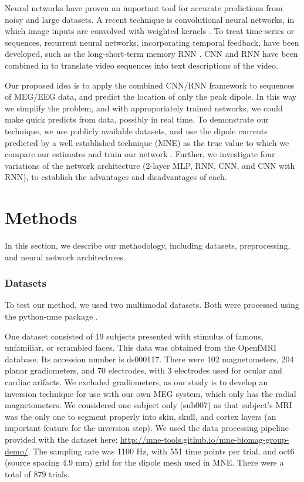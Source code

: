 \documentclass[journal]{IEEEtran}
\begin{document}
Neural networks have proven an important tool for accurate predictions from noisy and large datasets. A recent technique is convolutional neural networks, in which image inputs are convolved with weighted kernels \cite{lecun1998gradient}. To treat time-series or sequences, recurrent neural networks, incorporating temporal feedback, have been developed, such as the long-short-term memory RNN \cite{hochreiter1997long}. CNN and RNN have been combined in \cite{venugopalan2014translating} to translate video sequences into text descriptions of the video.


Our proposed idea is to apply the combined CNN/RNN framework to sequences of MEG/EEG data, and predict the location of only the peak dipole. In this way we simplify the problem, and with approporiately trained networks, we could make quick predicts from data, possibly in real time. To demonstrate our technique, we use publicly available datasets, and use the dipole currents predicted by a well established technique (MNE) as the true value to which we compare our estimates and train our network \cite{gramfort2014mne}. Further, we investigate four variations of the network architecture (2-layer MLP, RNN, CNN, and CNN with RNN), to establish the advantages and disadvantages of each.

\section{Methods}

In this section, we describe our methodology, including datasets, preprocessing, and neural network architectures.

\subsubsection{Datasets}

To test our method, we used two multimodal datasets. Both were processed using the python-mne package \cite{gramfort2014mne}.

One dataset \cite{wakeman2015multi} consisted of 19 subjects presented with stimulus of famous, unfamiliar, or scrambled faces. This data was obtained from the OpenfMRI database. Its accession number is ds000117. There were 102 magnetometers, 204 planar gradiometers, and 70 electrodes, with 3 electrodes used for ocular and cardiac arifacts. We excluded gradiometers, as our study is to develop an inversion technique for use with our own MEG system, which only has the radial magnetometers. We considered one subject only (sub007) as that subject's MRI was the only one to segment properly into skin, skull, and cortex layers (an important feature for the inversion step). We used the data processing pipeline provided with the dataset here: \url{http://mne-tools.github.io/mne-biomag-group-demo/}. The sampling rate was 1100 Hz, with 551 time points per trial, and oct6 (source spacing 4.9 mm) grid for the dipole mesh used in MNE. There were a total of 879 trials.
\end{document}

